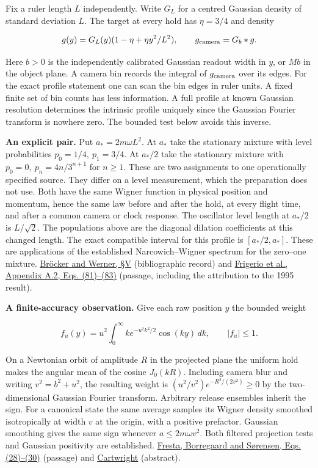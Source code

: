 \documentclass[11pt,a4paper]{article}
\begin{document}
Fix a ruler length \(L\) independently. Write \(G_L\) for a centred
Gaussian density of standard deviation \(L\). The target at every hold
has \(\eta=3/4\) and density

\[
 g(y)=G_L(y)(1-\eta+\eta y^2/L^2),\qquad
 g_{\rm camera}=G_b*g .
\]

Here \(b>0\) is the independently calibrated Gaussian readout width in
\(y\), or \(Mb\) in the object plane. A camera bin records the integral
of \(g_{\rm camera}\) over its edges. For the exact profile statement
one can scan the bin edges in ruler units. A fixed finite set of bin
counts has less information. A full profile at known Gaussian resolution
determines the intrinsic profile uniquely since the Gaussian Fourier
transform is nowhere zero. The bounded test below avoids this inverse.

\textbf{An explicit pair.} Put \(a_*=2m\omega L^2\). At \(a_*\) take the
stationary mixture with level probabilities \(p_0=1/4,\ p_1=3/4\). At
\(a_*/2\) take the stationary mixture with \(p_0=0,\ p_n=4n/3^{n+1}\)
for \(n\ge1\). These are two assignments to one operationally specified
source. They differ on a level measurement, which the preparation does
not use. Both have the same Wigner function in physical position and
momentum, hence the same law before and after the hold, at every flight
time, and after a common camera or clock response. The oscillator level
length at \(a_*/2\) is \(L/\sqrt2\). The populations above are the
diagonal dilation coefficients at this changed length. The exact
compatible interval for this profile is \([a_*/2,a_*]\). These are
applications of the established Narcowich--Wigner spectrum for the
zero--one mixture. \href{https://doi.org/10.1063/1.531326}{Bröcker and
Werner, §V} (bibliographic record) and
\href{https://arxiv.org/html/2611.03544v1\#A1.SS2}{Frigerio et al.,
Appendix A.2, Eqs. (81)--(83)} (passage, including the attribution to
the 1995 result).

\textbf{A finite-accuracy observation.} Give each raw position \(y\) the
bounded weight

\[
 f_u(y)=u^2\int_0^\infty k e^{-u^2k^2/2}\cos(ky)\,dk,\qquad |f_u|\le1 .
\]

On a Newtonian orbit of amplitude \(R\) in the projected plane the
uniform hold makes the angular mean of the cosine \(J_0(kR)\). Including
camera blur and writing \(v^2=b^2+u^2\), the resulting weight is
\((u^2/v^2)e^{-R^2/(2v^2)}\ge0\) by the two-dimensional Gaussian Fourier
transform. Arbitrary release ensembles inherit the sign. For a canonical
state the same average samples its Wigner density smoothed isotropically
at width \(v\) at the origin, with a positive prefactor. Gaussian
smoothing gives the same sign whenever \(a\le2m\omega v^2\). Both
filtered projection tests and Gaussian positivity are established.
\href{https://arxiv.org/html/1508.00828v1\#S3}{Fresta, Borregaard and
Sørensen, Eqs. (28)--(30)} (passage) and
\href{https://doi.org/10.1016/0378-4371(76)90145-X}{Cartwright}
(abstract).
\end{document}
